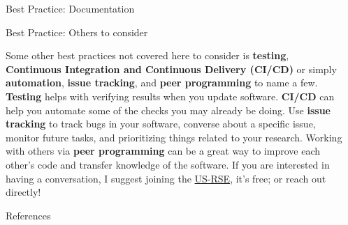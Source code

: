 \documentclass[final]{beamer}
\newlength{\sepwidth}
\newlength{\colwidth}
\newcommand{\separatorcolumn}{\begin{column}{\sepwidth}\end{column}}
\begin{document}
\begin{frame}[t]
\begin{columns}[t]
\begin{column}{\colwidth}
\begin{block}{Best Practice: Documentation}
  \end{block}

  \begin{block}{Best Practice: Others to consider}

    Some other best practices not covered here to consider is \textbf{testing},
    \textbf{Continuous Integration and Continuous Delivery (CI/CD)} or simply
    \textbf{automation}, \textbf{issue tracking}, and \textbf{peer programming}
    to name a few.
    \textbf{Testing} helps with verifying results when you update software.
    \textbf{CI/CD} can help you automate some of the checks you may already be
    doing.
    Use \textbf{issue tracking} to track bugs in your software, converse about
    a specific issue, monitor future tasks, and prioritizing things related to
    your research.
    Working with others via \textbf{peer programming} can be a great way to
    improve each other's code and transfer knowledge of the software.
    If you are interested in having a conversation, I suggest joining the
    \href{https://us-rse.org}{US-RSE}, it's free; or reach out directly!

  \end{block}

  \begin{block}{References}

    \nocite{*}
    \footnotesize{}

  \end{block}

\end{column}

\separatorcolumn
\end{columns}
\end{frame}
\end{document}
